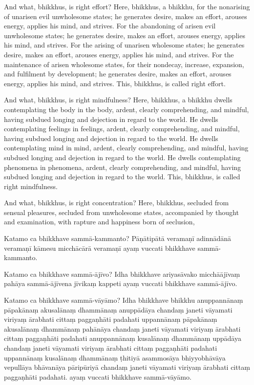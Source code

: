 And what, bhikkhus, is right effort? Here, bhikkhus, a bhikkhu, for the
nonarising of unarisen evil unwholesome states; he generates desire, makes an
effort, arouses energy, applies his mind, and strives. For the abandoning of
arisen evil unwholesome states; he generates desire, makes an effort, arouses
energy, applies his mind, and strives. For the arising of unarisen wholesome
states; he generates desire, makes an effort, arouses energy, applies his mind,
and strives. For the maintenance of arisen wholesome states, for their nondecay,
increase, expansion, and fulfilment by development; he generates desire, makes
an effort, arouses energy, applies his mind, and strives. This, bhikkhus, is
called right effort.

And what, bhikkhus, is right mindfulness? Here, bhikkhus, a bhikkhu dwells
contemplating the body in the body, ardent, clearly comprehending, and mindful,
having subdued longing and dejection in regard to the world. He dwells
contemplating feelings in feelings, ardent, clearly comprehending, and mindful,
having subdued longing and dejection in regard to the world. He dwells
contemplating mind in mind, ardent, clearly comprehending, and mindful, having
subdued longing and dejection in regard to the world. He dwells contemplating
phenomena in phenomena, ardent, clearly comprehending, and mindful, having
subdued longing and dejection in regard to the world. This, bhikkhus, is called
right mindfulness.

And what, bhikkhus, is right concentration? Here, bhikkhus, secluded from
sensual pleasures, secluded from unwholesome states, accompanied by thought and
examination, with rapture and happiness born of seclusion,

\paliPage

Katamo ca bhikkhave sammā-kammanto? Pāṇātipātā veramaṇī adinnādānā veramaṇī
kāmesu micchācārā veramaṇī ayaṃ vuccati bhikkhave sammā-kammanto.

Katamo ca bhikkhave sammā-ājīvo? Idha bhikkhave ariyasāvako micchāājīvaṃ pahāya
sammā-ājīvena jīvikaṃ kappeti ayaṃ vuccati bhikkhave sammā-ājīvo.

Katamo ca bhikkhave sammā-vāyāmo? Idha bhikkhave bhikkhu anuppannānaṃ pāpakānaṃ
akusalānaṃ dhammānaṃ anuppādāya chandaṃ janeti vāyamati viriyaṃ ārabhati cittaṃ
paggaṇhāti padahati uppannānaṃ pāpakānaṃ akusalānaṃ dhammānaṃ pahānāya chandaṃ
janeti vāyamati viriyaṃ ārabhati cittaṃ paggaṇhāti padahati anuppannānaṃ
kusalānaṃ dhammānaṃ uppādāya chandaṃ janeti vāyamati viriyaṃ ārabhati cittaṃ
paggaṇhāti padahati uppannānaṃ kusalānaṃ dhammānaṃ ṭhitiyā asammosāya
bhiyyobhāvāya vepullāya bhāvanāya pāripūriyā chandaṃ janeti vāyamati viriyaṃ
ārabhati cittaṃ paggaṇhāti padahati. ayaṃ vuccati bhikkhave sammā-vāyāmo.


